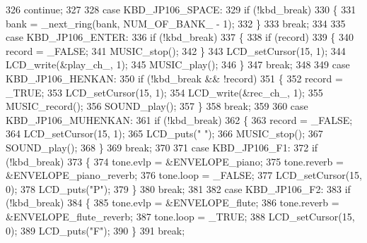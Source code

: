 \begin{DoxyCode}
{326             \textcolor{keywordflow}{continue};
327 
328         \textcolor{keywordflow}{case} KBD\_JP106\_SPACE:
329             \textcolor{keywordflow}{if} (!kbd\_break)
330             \{
331                 bank = \_next\_ring(bank, NUM_OF_BANK_ - 1);
332             \}
333             \textcolor{keywordflow}{break};
334 
335         \textcolor{keywordflow}{case} KBD\_JP106\_ENTER:
336             \textcolor{keywordflow}{if} (!kbd\_break)
337             \{
338                 \textcolor{keywordflow}{if} (record)
339                 \{
340                     record = \_FALSE;
341                     MUSIC\_stop();
342                 \}
343                 LCD\_setCursor(15, 1);
344                 LCD\_write(&play\_ch\_, 1);
345                 MUSIC\_play();
346             \}
347             \textcolor{keywordflow}{break};
348 
349         \textcolor{keywordflow}{case} KBD\_JP106\_HENKAN:
350             \textcolor{keywordflow}{if} (!kbd\_break && !record)
351             \{
352                 record = \_TRUE;
353                 LCD\_setCursor(15, 1);
354                 LCD\_write(&rec\_ch\_, 1);
355                 MUSIC\_record();
356                 SOUND\_play();
357             \}
358             \textcolor{keywordflow}{break};
359 
360         \textcolor{keywordflow}{case} KBD\_JP106\_MUHENKAN:
361             \textcolor{keywordflow}{if} (!kbd\_break)
362             \{
363                 record = \_FALSE;
364                 LCD\_setCursor(15, 1);
365                 LCD\_puts(\textcolor{stringliteral}{" "});
366                 MUSIC\_stop();
367                 SOUND\_play();
368             \}
369             \textcolor{keywordflow}{break};
370 
371         \textcolor{keywordflow}{case} KBD\_JP106\_F1:
372             \textcolor{keywordflow}{if} (!kbd\_break)
373             \{
374                 tone.evlp = &ENVELOPE\_piano;
375                 tone.reverb = &ENVELOPE\_piano\_reverb;
376                 tone.loop = \_FALSE;
377                 LCD\_setCursor(15, 0);
378                 LCD\_puts(\textcolor{stringliteral}{"P"});
379             \}
380             \textcolor{keywordflow}{break};
381 
382         \textcolor{keywordflow}{case} KBD\_JP106\_F2:
383             \textcolor{keywordflow}{if} (!kbd\_break)
384             \{
385                 tone.evlp = &ENVELOPE\_flute;
386                 tone.reverb = &ENVELOPE\_flute\_reverb;
387                 tone.loop = \_TRUE;
388                 LCD\_setCursor(15, 0);
389                 LCD\_puts(\textcolor{stringliteral}{"F"});
390             \}
391             \textcolor{keywordflow}{break};
}
\end{DoxyCode}
